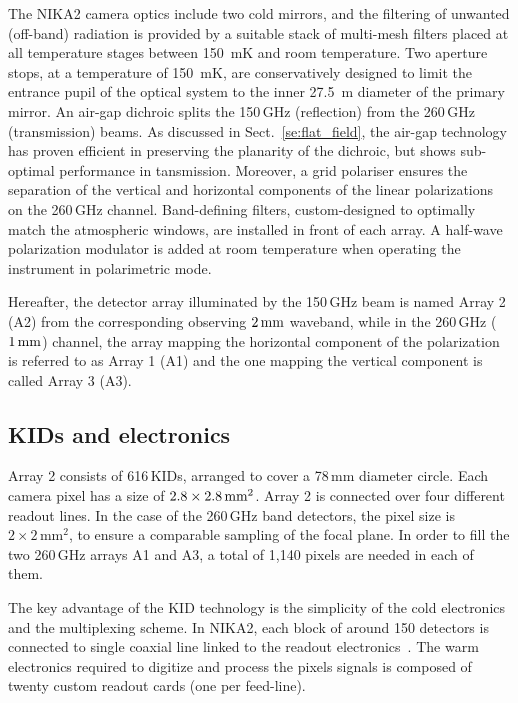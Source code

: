 The NIKA2 camera optics include two cold mirrors, and the filtering of
unwanted (off-band) radiation is provided by a suitable stack of
multi-mesh filters placed at all temperature stages between 150~mK and
room temperature. {\lp Two aperture stops, at a temperature of 150~mK,
are conservatively designed to limit the entrance pupil of the optical
system to the inner 27.5~m diameter of the primary mirror. }
An air-gap dichroic splits the 150\,GHz (reflection)
from the 260\,GHz (transmission) beams. As discussed in
Sect.~\ref{se:flat_field}, the air-gap technology has proven efficient
in preserving the planarity of the dichroic, but shows sub-optimal
performance in tansmission. Moreover, a grid polariser ensures the
separation of the vertical and horizontal components of the linear
polarizations on the 260\,GHz channel. Band-defining filters, custom-designed to
optimally match the atmospheric windows, are installed in
front of each array. A half-wave polarization modulator is added at room
temperature when operating the instrument in polarimetric mode.

Hereafter, the detector array illuminated by the 150\,GHz beam is named Array
2 (A2) from the corresponding observing $2\, \rm{mm}$ waveband,
while in the 260\,GHz ($1\, \rm{mm}$) channel, the array mapping the
horizontal component of the polarization is referred to as Array 1 (A1)
and the one mapping the vertical component is called Array 3 (A3). 

\subsection{KIDs and electronics}
\label{se:array}

Array 2 consists of 616\,KIDs, arranged to cover a 78\,mm diameter
circle. Each camera pixel has a size of
$2.8\times2.8\textrm{\,mm}^2$. Array 2 is connected over four different
readout lines. In the case of the 260\,GHz band detectors, the pixel size is
$2\times 2\mathrm{\,mm}^2$, to ensure a comparable sampling of the focal
plane. In order to fill the two 260\,GHz arrays A1 and A3, a total of
1,140 pixels are needed in each of them.

The key advantage of the KID technology is the simplicity of the cold
electronics and the multiplexing scheme. In NIKA2, each block of around 150
detectors is connected to single coaxial line linked to the readout
electronics~\citep{Bourrion2016}.
The warm electronics required to digitize
and process the pixels signals is composed of twenty custom readout
cards (one per feed-line).

